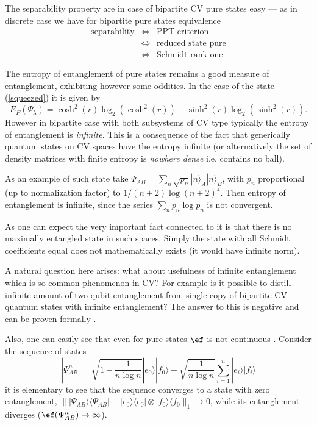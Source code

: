 \documentclass[twocolumn,aps,rmp]{revtex4}
\begin{document}
The separability property are in case of bipartite CV pure states easy
--- as in discrete case we have for bipartite pure states equivalence
\begin{eqnarray}
\textrm{separability} &\Leftrightarrow& \textrm{PPT criterion} \nonumber \\
& \Leftrightarrow& \textrm{reduced state pure} \nonumber \\
&\Leftrightarrow& \textrm{Schmidt rank one}
\end{eqnarray}


The entropy of entanglement of pure states remains a good measure of
entanglement, exhibiting however some oddities. In the case of the
state (\ref{squeezed}) it is given by
\cite{GaussianEoF,GaussianEoFPRA}
\begin{equation}
E_{F}(\Psi_\lambda)= \cosh^2(r)\log_2(\cosh^2(r)) - \sinh^2(r)
\log_2(\sinh^2(r)).
\end{equation}
However in bipartite case with both subsystems of CV type typically
the entropy of entanglement is {\it infinite}.  This is a consequence
of the fact that generically quantum states on CV spaces have the
entropy infinite \cite{Wehrl} (or alternatively the set of density
matrices with finite entropy is {\it nowhere dense} i.e. contains no
ball).

As an example of such state take $\Psi_{AB}=\sum_{n} \sqrt{p_{n}}
|n\rangle_{A}|n\rangle_{B}$, with $p_{n}$ proportional (up to
normalization factor) to ${1}/{(n+2) \log(n + 2)^{4}}$. Then entropy
of entanglement is infinite, since the series $\sum_{n}p_{n} \log
p_{n}$ is not convergent.

As one can expect the very important fact connected to it is that
there is no maximally entangled state in such spaces. Simply the state
with all Schmidt coefficients equal does not mathematically exists (it
would have infinite norm).

A natural question here arises: what about usefulness of infinite
entanglement which is so common phenomenon in CV?  For example is it
possible to distill infinite amount of two-qubit entanglement from
single copy of bipartite CV quantum states with infinite entanglement?
The answer to this is negative and can be proven formally
\cite{InfiniteEntanglementKeyl}.

Also, one can easily see that even for pure states $\ef$ is not
continuous \cite{InfiniteEntanglementEisert}. Consider the sequence of
states
\begin{equation}
|\Psi_{AB}^{n}\>=\sqrt{1-\frac{1}{n\log n}} |e_{0}\rangle |f_{0}\rangle
+ \sqrt{\frac{1}{n \log n}} \sum_{i=1}^{n}| e_{i} \rangle
|f_{i}\rangle
\end{equation}
it is elementary to see that the sequence converges to a state with
zero entanglement, $\| |\Psi_{AB}\rangle \langle\Psi_{AB}| -
|e_{0}\rangle\langle e_{0}| \otimes
 |f_{0}\rangle\langle f_{0} \|_1 \rightarrow 0$,
while its entanglement diverges ($\ef(\Psi_{AB}^{n})\rightarrow
\infty$).
\end{document}
